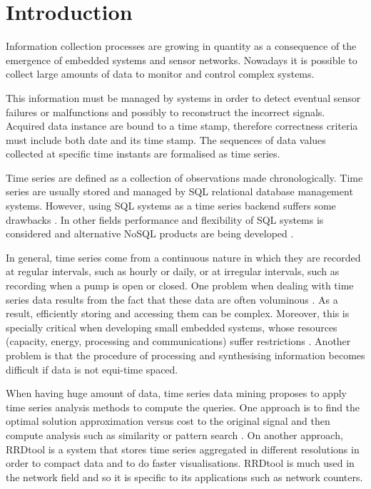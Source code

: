 


\section{Introduction}



Information collection processes are growing in quantity as a
consequence of the emergence of embedded systems and sensor networks.
Nowadays it is possible to collect large amounts of data to
monitor and control complex systems.

This information must be managed by systems in order to detect
eventual sensor failures or malfunctions and possibly to reconstruct
the incorrect signals. Acquired data instance are bound to a time
stamp, therefore correctness criteria must include both date and its
time stamp. The sequences of data values collected at specific time
instants are formalised as time series.

Time series are defined as a collection of observations made
chronologically. Time series are usually stored and managed by SQL
relational database management systems. However, using SQL systems as
a time series backend suffers some drawbacks
\cite{dreyer94,schmidt95,stonebraker09:scidb,zhang11}.  In other
fields performance and flexibility of SQL systems is considered and
alternative NoSQL products are being developed
\cite{atzeni13:relational_model_dead,stonebraker10}.

In general, time series come from a continuous nature in which they
are recorded at regular intervals, such as hourly or daily, or at
irregular intervals, such as recording when a pump is open or closed.
One problem when dealing with time series data results from the fact
that these data are often voluminous \cite{fu11,keogh08:isax}. As a
result, efficiently storing and accessing them can be
complex. Moreover, this is specially critical when developing small
embedded systems, whose resources (capacity, energy, processing and
communications) suffer restrictions \cite{yaogehrke02}.  Another
problem is that the procedure of processing and synthesising
information becomes difficult if data is not equi-time spaced.


When having huge amount of data, time series data mining proposes to
apply time series analysis methods to compute the queries. One
approach is to find the optimal solution approximation versus cost to
the original signal and then compute analysis such as similarity or
pattern search \cite{fu11,keogh01,last01}.  On another approach,
RRDtool \cite{rrdtool} is a system that stores time series aggregated
in different resolutions in order to compact data and to do faster
visualisations. RRDtool is much used in the network field and so it is
specific to its applications such as network counters.


